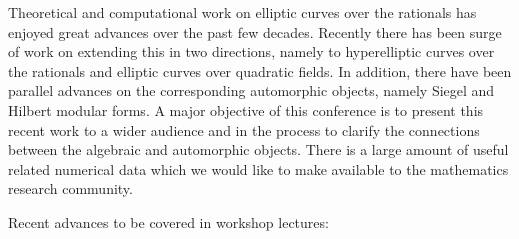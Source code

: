 \documentclass[12pt]{amsart}
\numberwithin{equation}{section}
\begin{document}
\bigskip

Theoretical and computational work on elliptic curves over the
rationals has enjoyed great advances over the past few decades.
Recently there has been surge of work on extending this in two
directions, namely to hyperelliptic curves over the rationals and
elliptic curves over quadratic fields.  In addition, there have been
parallel advances on the corresponding automorphic objects, namely
Siegel and Hilbert modular forms.  A major objective of this
conference is to present this recent work to a wider audience and in
the process to clarify the connections between the algebraic and
automorphic objects.  There is a large amount of useful related
numerical data which we would like to make available to the
mathematics research community.

Recent advances to be covered in workshop lectures:
\end{document}
